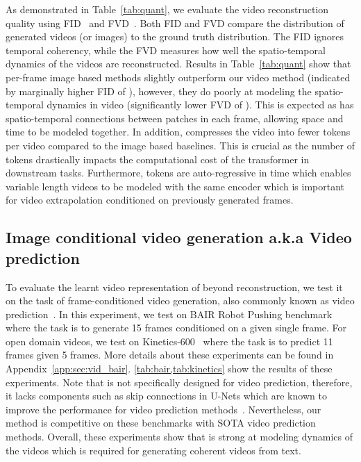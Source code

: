 As demonstrated in Table~\ref{tab:quant}, we evaluate the video reconstruction quality using FID~\cite{heusel2017gans} and FVD~\cite{unterthiner2018towards}. Both FID and FVD compare the distribution of generated videos (or images) to the ground truth distribution. The FID ignores temporal coherency, while the FVD measures how well the spatio-temporal dynamics of the videos are reconstructed. Results in Table~\ref{tab:quant} show that per-frame image based methods slightly outperform our video method (indicated by marginally higher FID of \cvivit), however, they do poorly at modeling the spatio-temporal dynamics in video (significantly lower FVD of \cvivit). This is expected as \cvivit has spatio-temporal connections between patches in each frame, allowing space and time to be modeled together. In addition, \cvivit compresses the video into fewer tokens per video compared to the image based baselines. This is crucial as the number of tokens drastically impacts the computational cost of the transformer in downstream tasks. Furthermore, \cvivit tokens are auto-regressive in time which enables variable length videos to be modeled with the same encoder which is important for video extrapolation conditioned on previously generated frames.

\subsection{Image conditional video generation a.k.a Video prediction}
\label{sec:vid_bair}


To evaluate the learnt video representation of \cvivit beyond reconstruction, we test it on the task of frame-conditioned video generation, also commonly known as video prediction~\cite{fitvid}. In this experiment, we test \phenaki on BAIR Robot Pushing benchmark~\cite{BAIRRobotPush} where the task is to generate 15 frames conditioned on a given single frame. For open domain videos, we test \phenaki on Kinetics-600~\cite{Kinetics600} where the task is to predict 11 frames given 5 frames. More details about these experiments can be found in Appendix~\ref{app:sec:vid_bair}. \cref{tab:bair,tab:kinetics} show the results of these experiments. Note that \phenaki is not specifically designed for video prediction, therefore, it lacks components such as skip connections in U-Nets which are known to improve the performance for video prediction methods~\cite{svg,villegas2019high,fitvid}. Nevertheless, our method is competitive on these benchmarks with SOTA video prediction methods. Overall, these experiments show that \phenaki is strong at modeling dynamics of the videos which is required for generating coherent videos from text.

